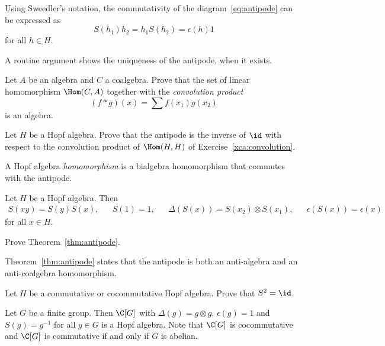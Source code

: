 \documentclass[12pt]{amsproc}
\begin{document}
Using Sweedler’s notation, the commutativity of the diagram~\eqref{eq:antipode} can be expressed as
\[
S(h_{1})h_{2}=h_{1}S(h_{2})=\epsilon(h)1
\]
for all $h\in H$. 

A routine argument shows the uniqueness of the antipode, when it exists.

\begin{exercise}
    \label{xca:convolution}
    Let $A$ be an algebra and $C$ a coalgebra. 
    Prove that the set 
    of linear homomorphism $\Hom(C,A)$ together with
    the \emph{convolution product}
    \[
    (f*g)(x) = \sum f(x_1)g(x_2)
    \]
    is an algebra. 
\end{exercise}

\begin{exercise}
    \label{xca:antipode}
    Let $H$ be a Hopf algebra. Prove that
    the antipode is the inverse of 
    $\id$ with respect to the convolution 
    product of $\Hom(H,H)$ of Exercise~\ref{xca:convolution}.
\end{exercise}

\begin{definition}
A Hopf algebra \emph{homomorphism} 
is a bialgebra homomorphism that commutes with the antipode. 
\end{definition}

\begin{theorem}
\label{thm:antipode}
    Let $H$ be a Hopf algebra. Then
    \begin{align*}
        S(xy)=S(y)S(x), && S(1)=1, &&
        \Delta(S(x))=S(x_{2})\otimes S(x_{1}),
        && \epsilon(S(x))=\epsilon(x)
    \end{align*}
    for all $x\in H$. 
\end{theorem}

\begin{exercise}
    Prove Theorem~\ref{thm:antipode}.
\end{exercise}

Theorem~\ref{thm:antipode} states that the antipode is both an anti-algebra and an anti-coalgebra homomorphism.

\begin{exercise}
    Let $H$ be a commutative or cocommutative Hopf algebra. 
    Prove that $S^2=\id$. 
\end{exercise}



\begin{example}
    Let $G$ be a finite group. Then $\C[G]$ with 
    $\Delta(g) = g\otimes g$,  
    $\epsilon(g)=1$ and $S(g)=g^{-1}$ for all $g\in G$ 
    is a Hopf algebra. Note that $\C[G]$ is cocommutative and 
    $\C[G]$ is commutative if and only if $G$ is abelian. 
\end{example}
\end{document}
